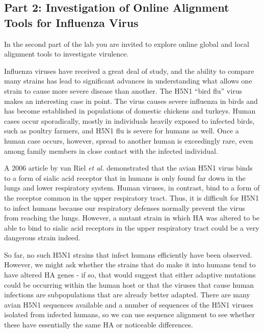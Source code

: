 \vspace*{-.1in}
\subsection*{Part 2:  Investigation of Online Alignment Tools for Influenza Virus}
\vspace*{-.1in} 

In the second part of the lab you are invited to explore online global and local alignment tools to investigate virulence. 

\noindent Influenza viruses have received a great deal of study, and the ability to compare many strains has lead to significant advances in understanding what allows one strain to cause more severe disease than another.  The H5N1 ``bird flu'' virus makes an interesting case in point.  The virus causes severe influenza in birds and has become established in populations of domestic chickens and turkeys.  Human cases occur sporadically, mostly in individuals heavily exposed to infected birds, such as poultry farmers, and H5N1 flu is severe for humans as well.  Once a human case occurs, however, spread to another human is exceedingly rare, even among family members in close contact with the infected individual.  

\noindent A 2006 article by van Riel \emph{et al.} demonstrated that the avian H5N1 virus binds to a form of sialic acid receptor that in humans is only found far down in the lungs and lower respiratory system.  Human viruses, in contrast, bind to a form of the receptor common in the upper respiratory tract. Thus, it is difficult for H5N1 to infect humans because our respiratory defenses normally prevent the virus from reaching the lungs.  However, a mutant strain in which HA was altered to be able to bind to sialic acid receptors in the upper respiratory tract could be a very dangerous strain indeed.

\noindent So far, no such H5N1 strains that infect humans efficiently have been observed.  However, we might ask whether the strains that do make it into humans tend to have altered HA genes  - if so, that would suggest that either adaptive mutations could be occurring within the human host or that the viruses that cause human infections are subpopulations that are already better adapted.  There are many avian H5N1 sequences available and a number of sequences of the H5N1 viruses isolated from infected humans, so we can use sequence alignment to see whether these have essentially the same HA or noticeable differences.

